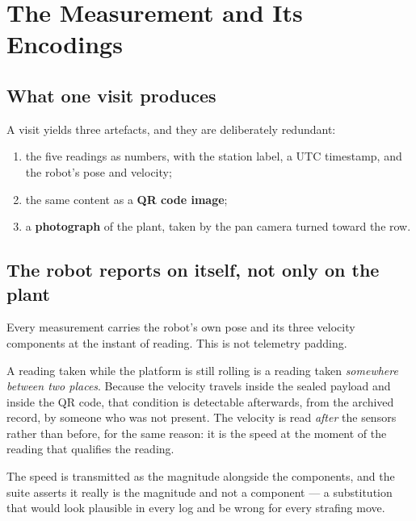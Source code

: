 \section{The Measurement and Its Encodings}
\label{sec:phaseC_measurement}

\subsection{What one visit produces}

A visit yields three artefacts, and they are deliberately redundant:

\begin{enumerate}[leftmargin=*,itemsep=1pt,topsep=2pt]
  \item the five readings as numbers, with the station label, a UTC
        timestamp, and the robot's pose and velocity;
  \item the same content as a \textbf{QR code image};
  \item a \textbf{photograph} of the plant, taken by the pan camera
        turned toward the row.
\end{enumerate}

\subsection{The robot reports on itself, not only on the plant}

Every measurement carries the robot's own pose and its three velocity
components at the instant of reading. This is not telemetry padding.

A reading taken while the platform is still rolling is a reading taken
\emph{somewhere between two places}. Because the velocity travels inside
the sealed payload and inside the QR code, that condition is detectable
afterwards, from the archived record, by someone who was not present.
The velocity is read \emph{after} the sensors rather than before, for
the same reason: it is the speed at the moment of the reading that
qualifies the reading.

The speed is transmitted as the magnitude alongside the components, and
the suite asserts it really is the magnitude and not a component --- a
substitution that would look plausible in every log and be wrong for
every strafing move.


